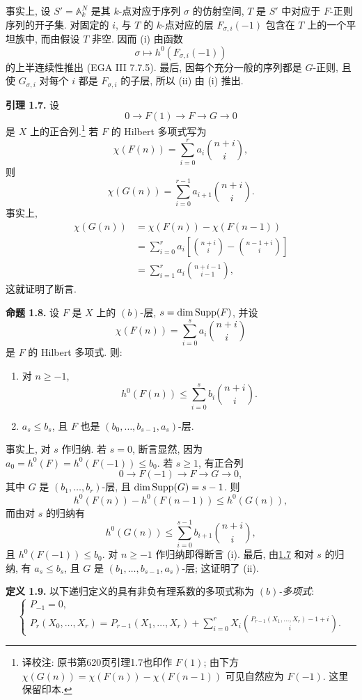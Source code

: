 事实上, 设 \(S'=\mathbb A_k^N\) 是其 \(k\)-点对应于序列 \(\sigma\) 的仿射空间, \(T\) 是 \(S'\) 中对应于 \(F\)-正则序列的开子集. 对固定的 \(i\), 与 \(T\) 的 \(k\)-点对应的层 \(F_{\sigma,i}(-1)\) 包含在 \(T\) 上的一个平坦族中, 而由假设 \(T\) 非空. 因而 (i) 由函数
\[
  \sigma\longmapsto h^0(F_{\sigma,i}(-1))
\]
的上半连续性推出 (EGA III 7.7.5). 最后, 因每个充分一般的序列都是 \(G\)-正则, 且使 \(G_{\sigma,i}\) 对每个 \(i\) 都是 \(F_{\sigma,i}\) 的子层, 所以 (ii) 由 (i) 推出.

\textbf{引理 1.7.} 设
\[
  0\longrightarrow F(1)\longrightarrow F\longrightarrow G\longrightarrow0
\]
是 \(X\) 上的正合列.\footnote{译校注: 原书第620页引理1.7也印作 $F(1)$; 由下方 $\chi(G(n))=\chi(F(n))-\chi(F(n-1))$ 可见自然应为 $F(-1)$. 这里保留印本.} 若 \(F\) 的 Hilbert 多项式写为
\[
  \chi(F(n))=\sum_{i=0}^{r}a_i\binom{n+i}{i},
\]
则
\[
  \chi(G(n))=\sum_{i=0}^{r-1}a_{i+1}\binom{n+i}{i}.
\]
事实上,
\[
\begin{aligned}
  \chi(G(n))
  &=\chi(F(n))-\chi(F(n-1))\\
  &=\sum_{i=0}^{r}a_i
    \left[\binom{n+i}{i}-\binom{n-1+i}{i}\right]\\
  &=\sum_{i=1}^{r}a_i\binom{n+i-1}{i-1},
\end{aligned}
\]
这就证明了断言.

\textbf{命题 1.8.} 设 \(F\) 是 \(X\) 上的 \((b)\)-层, \(s=\dim\operatorname{Supp}(F)\), 并设
\[
  \chi(F(n))=\sum_{i=0}^{s}a_i\binom{n+i}{i}
\]
是 \(F\) 的 Hilbert 多项式. 则:
\begin{enumerate}[label=(\roman*)]
\item 对 \(n\geq-1\),
\[
  h^0(F(n))\leq\sum_{i=0}^{s}b_i\binom{n+i}{i}.
\]
\item \(a_s\leq b_s\), 且 \(F\) 也是 \((b_0,\ldots,b_{s-1},a_s)\)-层.
\end{enumerate}
事实上, 对 \(s\) 作归纳. 若 \(s=0\), 断言显然, 因为 \(a_0=h^0(F)=h^0(F(-1))\leq b_0\). 若 \(s\geq1\), 有正合列
\[
  0\longrightarrow F(-1)\longrightarrow F\longrightarrow G\longrightarrow0,
\]
其中 \(G\) 是 \((b_1,\ldots,b_r)\)-层, 且 \(\dim\operatorname{Supp}(G)=s-1\). 则
\[
  h^0(F(n))-h^0(F(n-1))\leq h^0(G(n)),
\]
而由对 \(s\) 的归纳有
\[
  h^0(G(n))\leq
  \sum_{i=0}^{s-1}b_{i+1}\binom{n+i}{i},
\]
且 \(h^0(F(-1))\leq b_0\). 对 \(n\geq-1\) 作归纳即得断言 (i). 最后, 由\hyperlink{sga6.e13.lem.1-7}{1.7} 和对 \(s\) 的归纳, 有 \(a_s\leq b_s\), 且 \(G\) 是 \((b_1,\ldots,b_{s-1},a_s)\)-层; 这证明了 (ii).

\textbf{定义 1.9.} 以下递归定义的具有非负有理系数的多项式称为 \emph{\((b)\)-多项式}:
\[
\begin{cases}
P_{-1}=0,\\
P_r(X_0,\ldots,X_r)=P_{r-1}(X_1,\ldots,X_r)
+\displaystyle\sum_{i=0}^{r}X_i
\binom{P_{r-1}(X_1,\ldots,X_r)-1+i}{i}.
\end{cases}
\]

